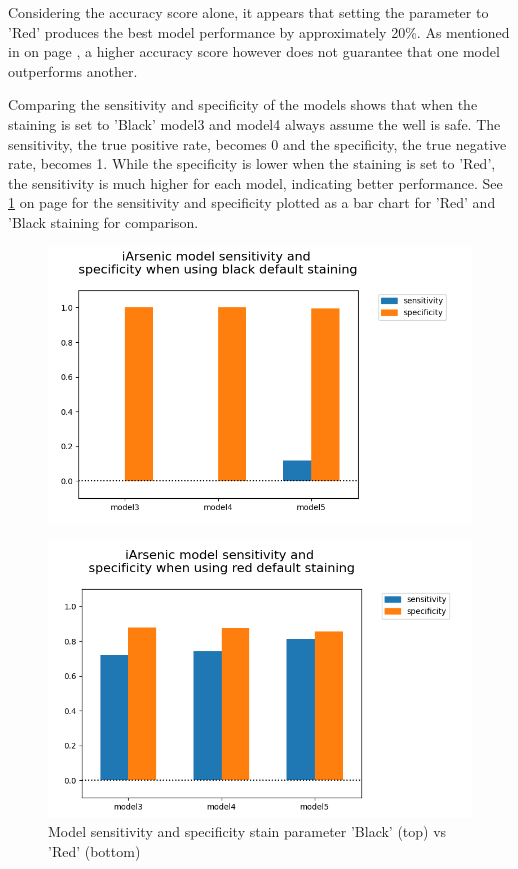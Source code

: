 \newpage

Considering the accuracy score alone, it appears that setting the parameter to 'Red' produces the best model performance by approximately 20\%. As mentioned in \cite{EM} on page \pageref{EM}, a higher accuracy score however does not guarantee that one model outperforms another.

Comparing the sensitivity and specificity of the models shows that when the staining is set to 'Black' model3 and model4 always assume the well is safe. The sensitivity, the true positive rate, becomes 0 and the specificity, the true negative rate, becomes 1. While the specificity is lower when the staining is set to 'Red', the sensitivity is much higher for each model, indicating better performance. See \ref{fig:x ia_svs_red} on page \pageref{fig:x ia_svs_red} for the sensitivity and specificity plotted as a bar chart for 'Red' and 'Black staining for comparison.

\newpage

\begin{figure}[!htb]
    \centering
    \includegraphics[scale=0.55]{figures/ia_models_sensitivity_vs_specificity_black.png} 
    \label{fig:x ia_svs_black}

    \includegraphics[scale=0.55]{figures/iarsenic_model_sensitivity_vs_specificity_red.png} 
    \caption{Model sensitivity and specificity stain parameter 'Black' (top) vs 'Red' (bottom)}
    \label{fig:x ia_svs_red}
\end{figure}

